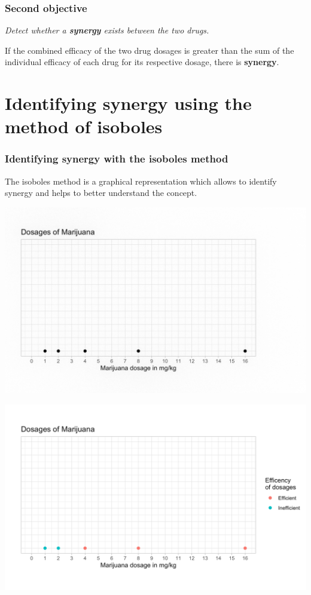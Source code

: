 \documentclass[14pt]{beamer}
\begin{document}
\begin{frame}
\frametitle{Second objective}
\textit{Detect whether a \textbf{synergy} exists between the two drugs.}

\bigskip

If the combined efficacy of the two drug dosages is greater than the sum of the individual efficacy of each drug for its respective dosage, there is \textbf{synergy}.
\end{frame}


\section{Identifying synergy using the method of isoboles}
\begin{frame}
\frametitle{Identifying synergy with the isoboles method}
The isoboles method is a graphical representation which allows to identify synergy and helps to better understand the concept.
\end{frame}

\begin{frame}
\begin{center}
\includegraphics[scale=0.24]{img1.png}
\end{center}
\end{frame}

\begin{frame}
\begin{center}
\includegraphics[scale=0.24]{img2.png}
\end{center}
\end{frame}
\end{document}
